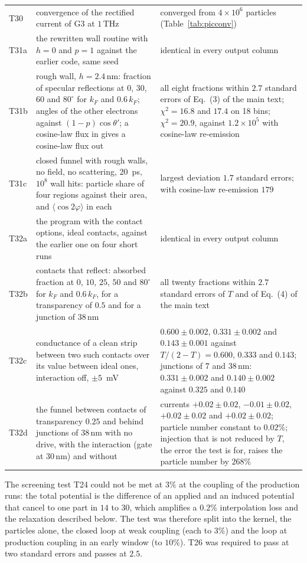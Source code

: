 \documentclass[aps,prapplied,onecolumn,superscriptaddress,floatfix]{revtex4-2}
\newcommand{\nm}{\,\mathrm{nm}}
\newcommand{\THz}{\,\mathrm{THz}}
\begin{document}
\begin{table}[ht]
\begin{ruledtabular}
\begin{tabular}{lp{}p{}}
T30 & convergence of the rectified current of G3 at $1\THz$ & converged from $4\times10^{6}$ particles (Table~\ref{tab:picconv}) \\
T31a & the rewritten wall routine with $h=0$ and $p=1$ against the earlier code, same seed & identical in every output column \\
T31b & rough wall, $h=2.4\nm$: fraction of specular reflections at $0$, $30$, $60$ and $80^{\circ}$ for $k_{F}$ and $0.6\,k_{F}$; angles of the other electrons against $(1-p)\cos\theta'$; a cosine-law flux in gives a cosine-law flux out & all eight fractions within $2.7$ standard errors of Eq.~(3) of the main text; $\chi^{2}=16.8$ and $17.4$ on 18 bins; $\chi^{2}=20.9$, against $1.2\times10^{5}$ with cosine-law re-emission \\
T31c & closed funnel with rough walls, no field, no scattering, $20$~ps, $10^{8}$ wall hits: particle share of four regions against their area, and $\langle\cos2\varphi\rangle$ in each & largest deviation $1.7$ standard errors; with cosine-law re-emission $179$ \\
T32a & the program with the contact options, ideal contacts, against the earlier one on four short runs & identical in every output column \\
T32b & contacts that reflect: absorbed fraction at $0$, $10$, $25$, $50$ and $80^{\circ}$ for $k_{F}$ and $0.6\,k_{F}$, for a transparency of $0.5$ and for a junction of $38\nm$ & all twenty fractions within $2.7$ standard errors of $T$ and of Eq.~(4) of the main text \\
T32c & conductance of a clean strip between two such contacts over its value between ideal ones, interaction off, $\pm5$~mV & $0.600\pm0.002$, $0.331\pm0.002$ and $0.143\pm0.001$ against $T/(2-T)=0.600$, $0.333$ and $0.143$; junctions of $7$ and $38\nm$: $0.331\pm0.002$ and $0.140\pm0.002$ against $0.325$ and $0.140$ \\
T32d & the funnel between contacts of transparency $0.25$ and behind junctions of $38\nm$ with no drive, with the interaction (gate at $30\nm$) and without & currents $+0.02\pm0.02$, $-0.01\pm0.02$, $+0.02\pm0.02$ and $+0.02\pm0.02$; particle number constant to $0.02\%$; injection that is not reduced by $T$, the error the test is for, raises the particle number by $268\%$ \\
\end{tabular}
\end{ruledtabular}
\end{table}

The screening test T24 could not be met at $3\%$ at the coupling of the
production runs: the total potential is the difference of an applied and
an induced potential that cancel to one part in $14$ to $30$, which
amplifies a $0.2\%$ interpolation loss and the relaxation described
below. The test was therefore split into the kernel, the particles
alone, the closed loop at weak coupling (each to $3\%$) and the loop at
production coupling in an early window (to $10\%$). T26 was required to
pass at two standard errors and passes at $2.5$.
\end{document}
